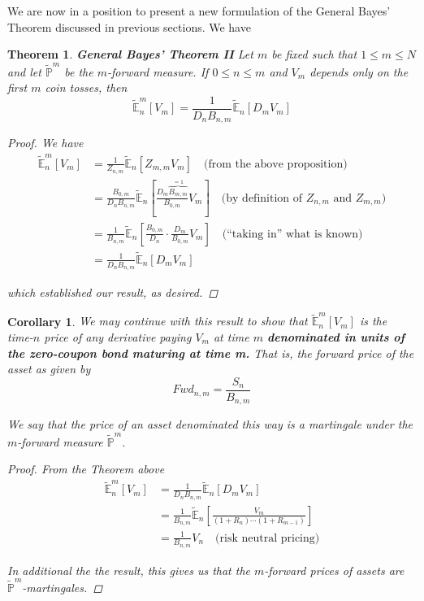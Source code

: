 \documentclass[12pt]{article}
\newtheorem{corollary}{Corollary}
\newtheorem{theorem}{Theorem}
\newlength\tindent
\renewcommand{\indent}{\hspace*{\tindent}}
\renewcommand{\P}{\mathbb P}
\newcommand{\E}{\mathbb E}
\begin{document}
\indent We  are now in a position to present a new formulation of the General Bayes' Theorem discussed in previous sections. We have
\begin{theorem}{\bf General Bayes' Theorem II} Let $m$ be fixed such that $1 \leq m \leq N$ and let $\tilde{\P}^m$ be the $m$-forward measure. If $0 \leq n \leq m$ and $V_m$ depends only on the first $m$ coin tosses, then
\begin{equation*}
	\tilde{\E}^m_n[V_m] = \frac{1}{D_nB_{n,m}} \tilde{\E}_n [D_mV_m]
\end{equation*}

\begin{proof} We have
\begin{align*}
	\tilde{\E}^m_n [V_m] &= \frac{1}{Z_{n,m}} \tilde{\E}_n [Z_{m,m}V_m] \quad \text{(from the above proposition)} \\
	&= \frac{ B_{0,m} }{ D_n B_{n,m} } \tilde{\E}_n \left[ \frac{ D_m \overbrace{B_{m,m}}^{=1} }{ B_{0,m} } V_m \right] \quad \text{(by definition of $Z_{n,m}$ and $Z_{m,m}$)} \\
		&= \frac{ 1 }{ B_{n,m} } \tilde{\E}_n \left[ \frac{B_{0,m}}{D_n} \cdot \frac{ D_m }{ B_{0,m} } V_m \right] \quad \text{(``taking in'' what is known)} \\
		&= \frac{ 1 }{ D_nB_{n,m} } \tilde{\E}_n \left[ D_m V_m \right]
\end{align*}

which established our result, as desired. 
\end{proof}
\end{theorem}

\begin{corollary} We may continue with this result to show that $\tilde{\E}^m_n[V_m]$ is the time-$n$ price of any derivative paying $V_m$ at time $m$ {\bf{\em denominated in units of the zero-coupon bond maturing at time m.}} That is, the {\em forward price} of the asset as given by
\begin{equation*}
	Fwd_{n,m} = \frac{ S_n }{B_{n,m}} 
\end{equation*}

\indent We say that the price of an asset denominated this way is a martingale under the $m$-forward measure $\tilde{\P}^m$.

\begin{proof} From the Theorem above
\begin{align*}
\tilde{\E}^m_n [V_m] &= \frac{ 1 }{ D_nB_{n,m} } \tilde{\E}_n \left[ D_m V_m \right] \\
		&= \frac{ 1 }{ B_{n,m} } \tilde{\E}_n \left[ \frac{ V_m }{(1 + R_n)\cdots(1 + R_{m - 1})} \right] \\
		&= \frac{1}{ B_{n,m} } V_n \quad \text{(risk neutral pricing)} 
\end{align*}

\indent In additional the the result, this gives us that the $m$-forward prices of assets are $\tilde{\P}^m$-martingales.
\end{proof}
\end{corollary}
\end{document}
